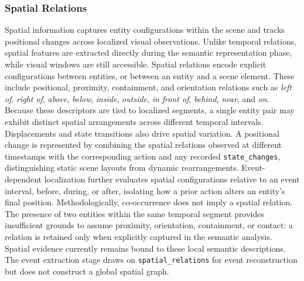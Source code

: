 \subsubsection*{Spatial Relations}
Spatial information captures entity configurations within the scene and tracks positional changes across localized visual observations. Unlike temporal relations, spatial features are extracted directly during the semantic representation phase, while visual windows are still accessible.
Spatial relations encode explicit configurations between entities, or between an entity and a scene element. These include positional, proximity, containment, and orientation relations such as \textit{left of}, \textit{right of}, \textit{above}, \textit{below}, \textit{inside}, \textit{outside}, \textit{in front of}, \textit{behind}, \textit{near}, and \textit{on}. Because these descriptors are tied to localized segments, a single entity pair may exhibit distinct spatial arrangements across different temporal intervals.
Displacements and state transitions also drive spatial variation. A positional change is represented by combining the spatial relations observed at different timestamps with the corresponding action and any recorded \texttt{state\_changes}, distinguishing static scene layouts from dynamic rearrangements. Event-dependent localization further evaluates spatial configurations relative to an event interval, before, during, or after, isolating how a prior action alters an entity's final position.
Methodologically, co-occurrence does not imply a spatial relation. The presence of two entities within the same temporal segment provides insufficient grounds to assume proximity, orientation, containment, or contact: a relation is retained only when explicitly captured in the semantic analysis. Spatial evidence currently remains bound to these local semantic descriptions. The event extraction stage draws on \texttt{spatial\_relations} for event reconstruction but does not construct a global spatial graph.

